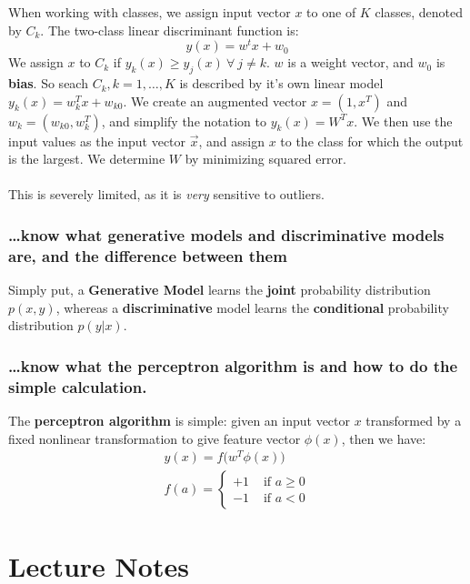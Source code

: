\documentclass[11pt]{article} %
\begin{document}
When working with classes, we assign input vector $x$ to one of $K$ classes, denoted by $C_k$. The two-class linear discriminant function is:
\begin{equation}
y(x) = w^tx + w_0
\end{equation}
We assign $x$ to $C_k$ if $y_k(x) \geq y_j(x)~\forall~j \neq k$. $w$ is a weight vector, and $w_0$ is {\bf bias}. So seach $C_k, k = 1, \ldots, K$ is described by it's own linear model $y_k(x) = w^T_kx + w_{k0}$. We create an augmented vector $x=(1,x^T)$ and $w_k = (w_{k0},w_k^T)$, and simplify the notation to $y_k(x) = W^Tx$. We then use the input values as the input vector $\vec{x}$, and assign $x$ to the class for which the output is the largest. We determine $W$ by minimizing squared error. \\
~\\
This is severely limited, as it is {\em very} sensitive to outliers.

\subsubsection{\ldots know what generative models and discriminative models are, and the difference between them}

Simply put, a {\bf Generative Model} learns the {\bf joint} probability distribution $p(x,y)$, whereas a {\bf discriminative} model learns the {\bf conditional} probability distribution $p(y|x)$.

\subsubsection{\ldots know what the perceptron algorithm is and how to do the simple calculation.}

The {\bf perceptron algorithm} is simple: given an input vector $x$ transformed by a fixed nonlinear transformation to give feature vector $\phi(x)$, then we have:
\begin{gather}
y(x) = f\big(w^T\phi(x)\big) \\
f(a) =
\begin{cases}
+1 & \text{ if }a \geq 0 \\
-1 & \text{ if }a < 0
\end{cases}
\end{gather}

\newpage


\section{Lecture Notes}
\end{document}
